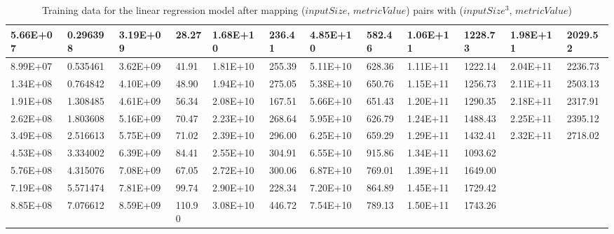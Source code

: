 \begin{table}[H]
\begin{center}
{\begin{tabular}{|l|l|l|l|l|l|l|l|l|l|l|l|}
5.66E+07  & 0.296398 & 3.19E+09  & 28.27  & 1.68E+10  & 236.41 & 4.85E+10  & 582.46 & 1.06E+11  & 1228.73 & 1.98E+11  & 2029.52 \\ \hline
8.99E+07  & 0.535461 & 3.62E+09  & 41.91  & 1.81E+10  & 255.39 & 5.11E+10  & 628.36 & 1.11E+11  & 1222.14 & 2.04E+11  & 2236.73 \\ \hline
1.34E+08  & 0.764842 & 4.10E+09  & 48.90  & 1.94E+10  & 275.05 & 5.38E+10  & 650.76 & 1.15E+11  & 1256.73 & 2.11E+11  & 2503.13 \\ \hline
1.91E+08  & 1.308485 & 4.61E+09  & 56.34  & 2.08E+10  & 167.51 & 5.66E+10  & 651.43 & 1.20E+11  & 1290.35 & 2.18E+11  & 2317.91 \\ \hline
2.62E+08  & 1.803608 & 5.16E+09  & 70.47  & 2.23E+10  & 268.64 & 5.95E+10  & 626.79 & 1.24E+11  & 1488.43 & 2.25E+11  & 2395.12 \\ \hline
3.49E+08  & 2.516613 & 5.75E+09  & 71.02  & 2.39E+10  & 296.00 & 6.25E+10  & 659.29 & 1.29E+11  & 1432.41 & 2.32E+11  & 2718.02 \\ \hline
4.53E+08  & 3.334002 & 6.39E+09  & 84.41  & 2.55E+10  & 304.91 & 6.55E+10  & 915.86 & 1.34E+11  & 1093.62 &           &         \\ \hline
5.76E+08  & 4.315076 & 7.08E+09  & 67.05  & 2.72E+10  & 300.06 & 6.87E+10  & 769.01 & 1.39E+11  & 1649.00 &           &         \\ \hline
7.19E+08  & 5.571474 & 7.81E+09  & 99.74  & 2.90E+10  & 228.34 & 7.20E+10  & 864.89 & 1.45E+11  & 1729.42 &           &         \\ \hline
8.85E+08  & 7.076612 & 8.59E+09  & 110.90 & 3.08E+10  & 446.72 & 7.54E+10  & 789.13 & 1.50E+11  & 1743.26 &           &         \\ \hline
\end{tabular}
}
\end{center}
\caption{Training data for the linear regression model after mapping ($inputSize$, $metricValue$) pairs with ($inputSize^3$, $metricValue$)}
\end{table}

